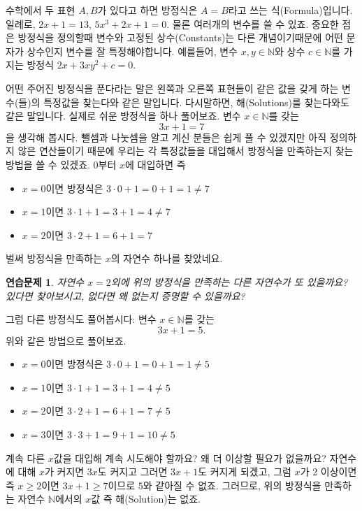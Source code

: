 \documentclass[a4paper, 11pt]{report}
\renewcommand{\<}{\langle}
\renewcommand{\>}{\rangle}
\newtheorem{exercise}[thm]{연습문제}
\begin{document}
수학에서 두 표현 $A, B$가 있다고 하면 방정식은 $A = B$라고 쓰는 식(Formula)입니다. 
일례로, $2x + 1 = 13$, $5x^3 + 2x + 1 = 0$. 물론 여러개의 변수를 쓸 수 있죠. 
중요한 점은 방정식을 정의할때 변수와 고정된 상수(Constants)는 다른 개념이기때문에 
어떤 문자가 상수인지 변수를 잘 특정해야합니다. 예를들어, 변수 $x, y \in \mathbb{N}$와 
상수 $c \in \mathbb{N}$를 가지는 방정식 $2x + 3xy^2 + c = 0$.

어떤 주어진 방정식을 푼다라는 말은 왼쪽과 오른쪽 표현들이 같은 값을 갖게 하는 변수(들)의
특정값을 찾는다와 같은 말입니다. 다시말하면, 해(Solutions)를 찾는다와도 같은 말입니다.
실제로 쉬운 방정식을 하나 풀어보죠. 변수 $x \in \mathbb{N}$를 갖는
$$
3x + 1 = 7
$$
을 생각해 봅시다. 뺄셈과 나눗셈을 알고 계신 분들은 쉽게 풀 수 있겠지만 아직 정의하지 않은 
연산들이기 때문에 우리는 각 특정값들을 대입해서 방정식을 만족하는지 찾는 방법을 쓸 수 있겠죠.
$0$부터 $x$에 대입하면 즉 
\begin{itemize}
  \item $x = 0$이면 방정식은 $3\cdot 0 + 1 = 0 + 1 = 1 \neq 7$
  \item $x = 1$이면 $3\cdot 1 + 1 = 3 + 1 = 4 \neq 7$
  \item $x = 2$이면 $3\cdot 2 + 1 = 6 + 1 = 7$
\end{itemize}
벌써 방정식을 만족하는 $x$의 자연수 하나를 찾았네요.

\begin{exercise}
  자연수 $x = 2$외에 위의 방정식을 만족하는 다른 자연수가 또 있을까요? 있다면 찾아보시고,
  없다면 왜 없는지 증명할 수 있을까요?
\end{exercise}

그럼 다른 방정식도 풀어봅시다: 변수 $x \in \mathbb{N}$를 갖는
$$
3x + 1 = 5.
$$
위와 같은 방법으로 풀어보죠.
\begin{itemize}
  \item $x = 0$이면 방정식은 $3\cdot 0 + 1 = 0 + 1 = 1 \neq 5$
  \item $x = 1$이면 $3\cdot 1 + 1 = 3 + 1 = 4 \neq 5$
  \item $x = 2$이면 $3\cdot 2 + 1 = 6 + 1 = 7 \neq 5$
  \item $x = 3$이면 $3\cdot 3 + 1 = 9 + 1 = 10 \neq 5$
\end{itemize}
계속 다른 $x$값을 대입해 계속 시도해야 할까요? 왜 더 이상할 필요가 없을까요? 자연수에 대해 $x$가 커지면
$3x$도 커지고 그러면 $3x+1$도 커지게 되겠고, 그럼 $x$가 2 이상이면 즉 $x \ge 2$이면 $3x + 1 \ge 7$이므로
$5$와 같아질 수 없죠. 그러므로, 위의 방정식을 만족하는 자연수 $\mathbb{N}$에서의 $x$값 즉 해(Solution)는 없죠.
\end{document}
